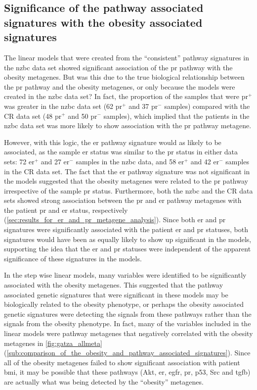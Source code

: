 \subsection{Significance of the pathway associated signatures with the obesity associated signatures}
\label{sub:significance_of_pr_pathway}

The linear models that were created from the ``consistent'' pathway signatures in the \gls{nzbc} data set showed significant association of the \gls{pr} pathway with the obesity metagenes.
But was this due to the true biological relationship between the \gls{pr} pathway and the obesity metagenes, or only because the models were created in the \gls{nzbc} data set?
In fact, the proportion of the samples that were \gls{pr}$^+$ was greater in the \gls{nzbc} data set (62 \gls{pr}$^+$ and 37 \gls{pr}$^-$ samples) compared with the CR data set (48 \gls{pr}$^+$ and 50 \gls{pr}$^-$ samples), which implied that the patients in the \gls{nzbc} data set was more likely to show association with the \gls{pr} pathway metagene.

However, with this logic, the \gls{er} pathway signature would as likely to be associated, as the  sample  \gls{er} status was similar to the \gls{pr} status in either data sets: 72 \gls{er}$^+$ and 27 \gls{er}$^-$ samples in the \gls{nzbc} data, and 58 \gls{er}$^+$ and  42 \gls{er}$^-$ samples in the  CR data set.
The fact that the \gls{er} pathway signature was not significant in the models suggested that the obesity metagenes were related to the \gls{pr} pathway irrespective of the sample \gls{pr} status.
Furthermore, both the \gls{nzbc} and the CR data sets showed strong association between the \gls{pr} and \gls{er} pathway metagenes with the patient \gls{pr} and \gls{er} status, respectively (\cref{sec:results_for_er_and_pr_metagene_analysis}).
Since both \gls{er} and \gls{pr} signatures were significantly associated with the patient \gls{er} and \gls{pr} statuses, both signatures would have been as equally likely to show up significant in the models, supporting the idea that the \gls{er} and \gls{pr} statuses were independent of the apparent significance of these signatures in the models.

In the step wise linear models, many variables were identified to be significantly associated with the obesity metagenes.
This suggested that the pathway associated genetic signatures that were significant in these models may be biologically related to the obesity phenotype, or perhaps the obesity associated genetic signatures were detecting the signals from these pathways rather than the signals from the obesity phenotype.
In fact, many of the variables included in the linear models were pathway metagenes that negatively correlated with the obesity metagenes in \cref{fig:gatza_allmeta} (\cref{sub:comparison_of_the_obesity_and_pathway_associated_signatures}).
Since all of the obesity metagenes failed to show significant association with patient \gls{bmi}, it may be possible that these pathways (Akt, \gls{er}, \gls{egfr}, \gls{pr}, p53, Src and \gls{tgfb}) are actually what was being detected by the ``obesity'' metagenes.

